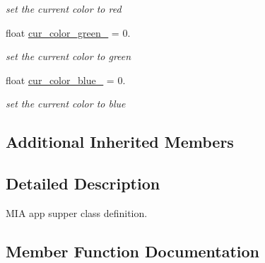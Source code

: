 \begin{DoxyCompactItemize}
\begin{DoxyCompactList}\small\item\em set the current color to red \end{DoxyCompactList}\item 
float \hyperlink{classimage__tools_1_1MIAApp_a3fa499af8daee2aef32f9cab85094947}{cur\+\_\+color\+\_\+green\+\_\+} = 0.\hypertarget{classimage__tools_1_1MIAApp_a3fa499af8daee2aef32f9cab85094947}{}\label{classimage__tools_1_1MIAApp_a3fa499af8daee2aef32f9cab85094947}

\begin{DoxyCompactList}\small\item\em set the current color to green \end{DoxyCompactList}\item 
float \hyperlink{classimage__tools_1_1MIAApp_a9bf7b1976bd529a7647ca908de2a4b3f}{cur\+\_\+color\+\_\+blue\+\_\+} = 0.\hypertarget{classimage__tools_1_1MIAApp_a9bf7b1976bd529a7647ca908de2a4b3f}{}\label{classimage__tools_1_1MIAApp_a9bf7b1976bd529a7647ca908de2a4b3f}

\begin{DoxyCompactList}\small\item\em set the current color to blue \end{DoxyCompactList}\end{DoxyCompactItemize}
\subsection*{Additional Inherited Members}


\subsection{Detailed Description}
M\+IA app supper class definition. 

\subsection{Member Function Documentation}
